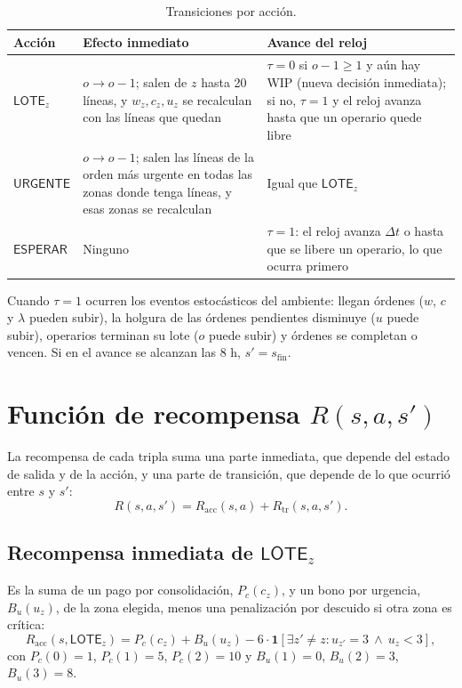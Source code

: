 \documentclass[11pt,letterpaper]{article}
\newcommand{\LOTE}[1]{\mathsf{LOTE}_{#1}}
\newcommand{\URG}{\mathsf{URGENTE}}
\newcommand{\ESP}{\mathsf{ESPERAR}}
\newcommand{\sfin}{s_{\mathrm{fin}}}
\begin{document}
\begin{table}[h]
\centering\small
\begin{tabularx}{\textwidth}{@{}p{2.1cm}LL@{}}
\toprule
\textbf{Acción} & \textbf{Efecto inmediato} & \textbf{Avance del reloj} \\
\midrule
$\LOTE{z}$ & $o \to o-1$; salen de $z$ hasta 20 líneas, y $w_z, c_z, u_z$ se recalculan con las líneas que quedan & $\tau=0$ si $o-1\ge1$ y aún hay WIP (nueva decisión inmediata); si no, $\tau=1$ y el reloj avanza hasta que un operario quede libre \\
$\URG$ & $o \to o-1$; salen las líneas de la orden más urgente en todas las zonas donde tenga líneas, y esas zonas se recalculan & Igual que $\LOTE{z}$ \\
$\ESP$ & Ninguno & $\tau=1$: el reloj avanza $\Delta t$ o hasta que se libere un operario, lo que ocurra primero \\
\bottomrule
\end{tabularx}
\caption{Transiciones por acción.}
\end{table}

Cuando $\tau = 1$ ocurren los eventos estocásticos del ambiente: llegan órdenes ($w$, $c$ y
$\lambda$ pueden subir), la holgura de las órdenes pendientes disminuye ($u$ puede subir),
operarios terminan su lote ($o$ puede subir) y órdenes se completan o vencen. Si en el avance se
alcanzan las 8 h, $s'=\sfin$.

\section{Función de recompensa \texorpdfstring{$R(s,a,s')$}{R(s,a,s')}}

La recompensa de cada tripla suma una parte inmediata, que depende del estado de salida y de la
acción, y una parte de transición, que depende de lo que ocurrió entre $s$ y $s'$:
\[
  R(s,a,s') = R_{\mathrm{acc}}(s,a) + R_{\mathrm{tr}}(s,a,s').
\]

\subsection{Recompensa inmediata de \texorpdfstring{$\LOTE{z}$}{LOTE\_z}}

Es la suma de un pago por consolidación, $P_c(c_z)$, y un bono por urgencia, $B_u(u_z)$, de la zona elegida,
menos una penalización por descuido si otra zona es crítica:
\[
  R_{\mathrm{acc}}(s,\LOTE{z}) = P_c(c_z) + B_u(u_z) - 6\cdot\mathbf{1}\!\left[\exists z'\neq z: u_{z'}=3 \ \wedge\ u_z<3\right],
\]
con $P_c(0)=1$, $P_c(1)=5$, $P_c(2)=10$ y $B_u(1)=0$, $B_u(2)=3$, $B_u(3)=8$.
\end{document}

